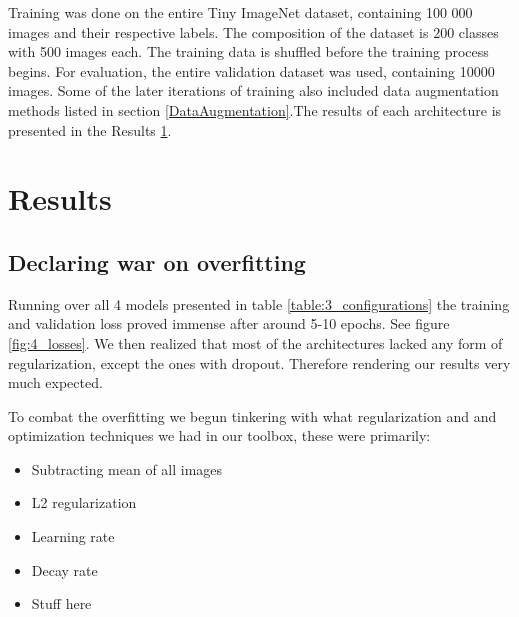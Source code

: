 \documentclass{kthreport}
\begin{document}

\FloatBarrier


Training was done on the entire Tiny ImageNet dataset, containing 100 000 images and their respective labels. The composition of the dataset is 200 classes with 500 images each. The training data is shuffled before the training process begins. For evaluation, the entire validation dataset was used, containing 10000 images. Some of the later iterations of training also included data augmentation methods listed in section \ref{DataAugmentation}.The results of each architecture is presented in the Results \ref{sec:Results}.


\section{Results}
\label{sec:Results}

\subsection{Declaring war on overfitting}

Running over all 4 models presented in table \ref{table:3_configurations} the training and validation loss proved immense after around 5-10 epochs. See figure \ref{fig:4_losses}. We then realized that most of the architectures lacked any form of regularization, except the ones with dropout. Therefore rendering our results very much expected.



To combat the overfitting we begun tinkering with what regularization and and optimization techniques we had in our toolbox, these were primarily:

\begin{itemize}
  \item Subtracting mean of all images
  \item L2 regularization
  \item Learning rate
  \item Decay rate
  \item Stuff here
\end{itemize}
\end{document}
